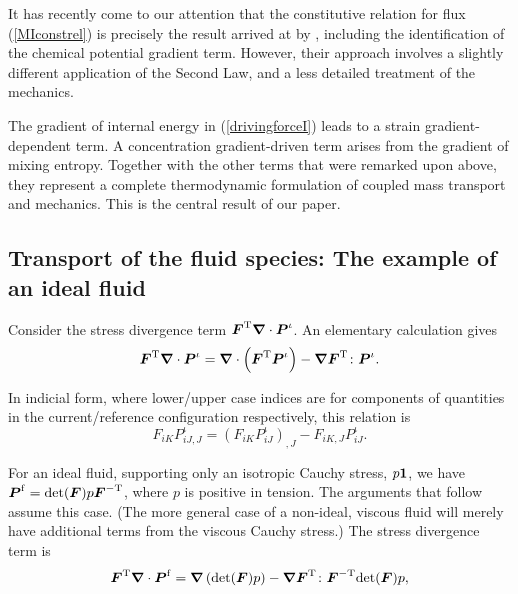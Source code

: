 It has recently come to our attention that the constitutive
relation for flux (\ref{MIconstrel}) is precisely the result
arrived at by \citet{DeGrootMazur:1984}, including the
identification of the chemical potential gradient term. However,
their approach involves a slightly different application of the
Second Law, and a less detailed treatment of the mechanics.

The gradient of internal energy in (\ref{drivingforceI}) leads to
a strain gradient-dependent term. A concentration gradient-driven
term arises from the gradient of mixing entropy. Together with the
other terms that were remarked upon above, they represent a
complete thermodynamic formulation of coupled mass transport and
mechanics. This is the central result of our paper.

\subsection{Transport of the fluid species: The example of an ideal fluid}\label{sect5.2}

Consider the stress divergence term
$\mbox{\boldmath$ F$}^\mathrm{T}\mbox{\boldmath$\nabla$}\cdot\mbox{\boldmath$ P$}^\iota$. An elementary calculation
gives
\begin{equation}
\mbox{\boldmath$ F$}^\mathrm{T}\mbox{\boldmath$\nabla$}\cdot\mbox{\boldmath$ P$}^\iota =
\mbox{\boldmath$\nabla$}\cdot\left(\mbox{\boldmath$ F$}^\mathrm{T}\mbox{\boldmath$ P$}^\iota\right) -
\mbox{\boldmath$\nabla$}\mbox{\boldmath$ F$}^\mathrm{T}\colon\mbox{\boldmath$ P$}^\iota. \label{stressdivI}
\end{equation}

\noindent In indicial form, where lower/upper case indices are for
components of quantities in the current/reference configuration
respectively, this relation is
\begin{displaymath}
F_{iK}P^\iota_{iJ,J} = \left(F_{iK}P^\iota_{iJ}\right)_{,J} -
F_{iK,J}P^\iota_{iJ}.
\end{displaymath}

\noindent For an ideal fluid, supporting only an isotropic Cauchy
stress, $p{\bf 1}$, we have $\mbox{\boldmath$ P$}^\mathrm{f} =
\mathrm{det}(\mbox{\boldmath$ F$})p\mbox{\boldmath$ F$}^{-\mathrm{T}}$, where $p$ is positive in
tension. The arguments that follow assume this case. (The more
general case of a non-ideal, viscous fluid will merely have
additional terms from the viscous Cauchy stress.) The stress
divergence term is
\begin{equation}
\mbox{\boldmath$ F$}^\mathrm{T}\mbox{\boldmath$\nabla$}\cdot\mbox{\boldmath$ P$}^\mathrm{f} =
\mbox{\boldmath$\nabla$}\left(\mathrm{det}(\mbox{\boldmath$ F$})p\right) -
\mbox{\boldmath$\nabla$}\mbox{\boldmath$ F$}^\mathrm{T}\colon\mbox{\boldmath$ F$}^{-\mathrm{T}}\mathrm{det}(\mbox{\boldmath$ F$})p,
\end{equation}

